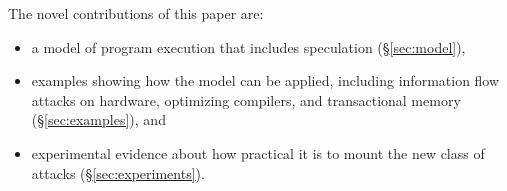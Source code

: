 The novel contributions of this paper are:
\begin{itemize}

\item a model of program execution that includes speculation (\S\ref{sec:model}),

\item examples showing how the model can be applied,
  including information flow attacks on
  hardware, optimizing compilers, and transactional memory (\S\ref{sec:examples}), and

\item experimental evidence about how practical it is to mount
  the new class of attacks (\S\ref{sec:experiments}).

\end{itemize}
